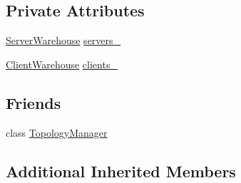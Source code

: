 \subsection*{Private Attributes}
\begin{DoxyCompactItemize}
\item 
\hyperlink{classapollo_1_1cyber_1_1service__discovery_1_1ServiceManager_a23a901a01fc5e61a4f6cc9aaac84dd24}{Server\-Warehouse} \hyperlink{classapollo_1_1cyber_1_1service__discovery_1_1ServiceManager_ac27c445960f7199217715a38325c490d}{servers\-\_\-}
\item 
\hyperlink{classapollo_1_1cyber_1_1service__discovery_1_1ServiceManager_af4e900ffa8e34995b8a6bca9bdfc6f9d}{Client\-Warehouse} \hyperlink{classapollo_1_1cyber_1_1service__discovery_1_1ServiceManager_ae2d14ffd418fd7a75576eca529b9b277}{clients\-\_\-}
\end{DoxyCompactItemize}
\subsection*{Friends}
\begin{DoxyCompactItemize}
\item 
class \hyperlink{classapollo_1_1cyber_1_1service__discovery_1_1ServiceManager_ae83aaddaeb682129a07c148e01291cdd}{Topology\-Manager}
\end{DoxyCompactItemize}
\subsection*{Additional Inherited Members}


